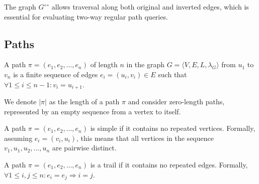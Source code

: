 The graph $G^\leftrightarrow$ allows traversal along both original and inverted edges, which is essential for evaluating two-way regular path queries.

\subsection{Paths}

\begin{definition}[Path]
	A path $\pi = (e_1, e_2, \ldots, e_n)$ of length $n$ in the graph $G = \langle V, E, L, \lambda_G \rangle$ from $u_1$ to $v_n$ is a finite sequence of edges $e_i = (u_i, v_i) \in E$ such that $\forall 1 \leq i \leq n - 1: v_i = u_{i+1}$.
\end{definition}

We denote $|\pi|$ as the length of a path $\pi$ and consider zero-length paths, represented by an empty sequence from a vertex to itself.

\begin{definition}
	A path $\pi = (e_1, e_2, \ldots, e_n)$ is simple if it contains no repeated vertices. Formally, assuming $e_i = (v_i, u_i)$, this means that all vertices in the sequence $v_1, u_1, u_2, \ldots, u_n$ are pairwise distinct.
\end{definition}

\begin{definition}[Trail]
	A path $\pi = (e_1, e_2, \ldots, e_n)$ is a trail if it contains no repeated edges. Formally, $\forall 1 \leq i, j \leq n: e_i = e_j \Rightarrow i = j$.
\end{definition}

